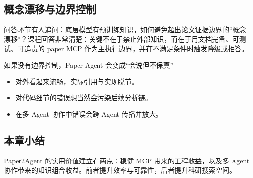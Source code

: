 \subsection{概念漂移与边界控制}

问答环节有人追问：底层模型有预训练知识，如何避免超出论文证据边界的``概念漂移''？课程回答非常清楚：关键不在于禁止外部知识，而在于用文档完备、可测试、可追责的 paper MCP 作为主执行边界，并在不满足条件时触发降级或拒答。

\begin{warningbox}{如果没有边界控制，Paper Agent 会变成``会说但不保真''}
\begin{itemize}
    \item 对外看起来流畅，实际引用与实现脱节。
    \item 对代码细节的错误想当然会污染后续分析链。
    \item 在多 Agent 协作中错误会跨 Agent 传播并放大。
\end{itemize}
\end{warningbox}

\subsection{本章小结}

Paper2Agent 的实用价值建立在两点：稳健 MCP 带来的工程收益，以及多 Agent 协作带来的知识组合收益。前者提升效率与可靠性，后者提升科研搜索空间。

